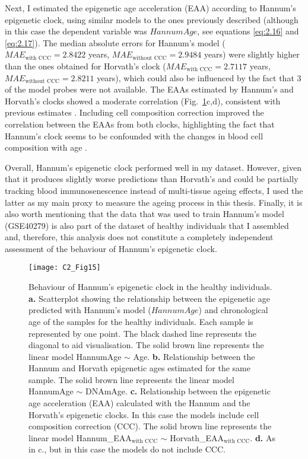 \bigskip

Next, I estimated the epigenetic age acceleration (EAA) according to Hannum's epigenetic clock, using similar models to the ones previously described (although in this case the dependent variable was $HannumAge$, see equations \ref{eq:2.16} and \ref{eq:2.17}). The median absolute errors for Hannum's model ($MAE_{\text{with CCC}} = 2.8422$ years, $MAE_{\text{without CCC}} = 2.9484$ years) were slightly higher than the ones obtained for Horvath's clock ($MAE_{\text{with CCC}} = 2.7117$ years, $MAE_{\text{without CCC}} = 2.8211$ years), which could also be influenced by the fact that 3 of the model probes were not available. The EAAs estimated by Hannum's and Horvath's clocks showed a moderate correlation (Fig.~\ref{fig:c2_fig15}c,d), consistent with previous estimates \cite{Irvin2018}. Including cell composition correction improved the correlation between the EAAs from both clocks, highlighting the fact that Hannum's clock seems to be confounded with the changes in blood cell composition with age \cite{Marioni2015,Irvin2018}. 

\bigskip

Overall, Hannum's epigenetic clock performed well in my dataset. However, given that it produces slightly worse predictions than Horvath's and could be partially tracking blood immunosenescence instead of multi-tissue ageing effects, I used the latter as my main proxy to measure the ageing process in this thesis. Finally, it is also worth mentioning that the data that was used to train Hannum's model (GSE40279) is also part of the dataset of healthy individuals that I assembled and, therefore, this analysis does not constitute a completely independent assessment of the behaviour of Hannum's epigenetic clock.


\begin{figure}[htbp!] 
	\centering
	\texttt{[image: C2\_Fig15]}
	\vspace*{2mm}    
	\caption[Behaviour of Hannum's epigenetic clock in the healthy individuals]{Behaviour of Hannum's epigenetic clock in the healthy individuals. \textbf{a.} Scatterplot showing the relationship between the epigenetic age predicted with Hannum's model ($HannumAge$) \cite{Hannum2013} and chronological age of the samples for the healthy individuals. Each sample is represented by one point. The black dashed line represents the diagonal to aid visualisation. The solid brown line represents the linear model HannumAge $\sim$ Age. \textbf{b.} Relationship between the Hannum and Horvath epigenetic ages estimated for the same sample. The solid brown line represents the linear model HannumAge $\sim$ DNAmAge. \textbf{c.} Relationship between the epigenetic age acceleration (EAA) calculated with the Hannum and the Horvath's epigenetic clocks. In this case the models include cell composition correction (CCC). The solid brown line represents the linear model Hannum\_EAA$_{\text{with CCC}}$ $\sim$ Horvath\_EAA$_{\text{with CCC}}$. \textbf{d.} As in c., but in this case the models do not include CCC.}
	\label{fig:c2_fig15}
\end{figure}



